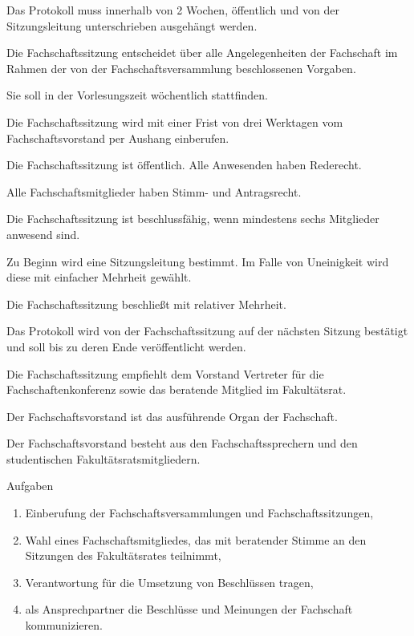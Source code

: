 \documentclass[a4paper, parskip=half, numbers=noenddot]{scrartcl}
\begin{document}
\begin{contract}
Das Protokoll muss innerhalb von 2 Wochen, öffentlich und von der Sitzungsleitung unterschrieben ausgehängt werden.

\enlargethispage*{\baselineskip}
\pagebreak


%
%

%
\label{fs:sitzung}

Die Fachschaftssitzung entscheidet über alle Angelegenheiten der Fachschaft im Rahmen der von der Fachschaftsversammlung beschlossenen Vorgaben.

Sie soll in der Vorlesungszeit wöchentlich stattfinden.

Die Fachschaftssitzung wird mit einer Frist von drei Werktagen vom Fachschaftsvorstand per Aushang einberufen.

Die Fachschaftssitzung ist öffentlich. Alle Anwesenden haben Rederecht.

Alle Fachschaftsmitglieder haben Stimm- und Antragsrecht.

Die Fachschaftssitzung ist beschlussfähig, wenn mindestens sechs Mitglieder anwesend sind.

Zu Beginn wird eine Sitzungsleitung bestimmt. Im Falle von Uneinigkeit wird diese mit einfacher Mehrheit gewählt.

Die Fachschaftssitzung beschließt mit relativer Mehrheit.

Das Protokoll wird von der Fachschaftssitzung auf der nächsten Sitzung bestätigt und soll bis zu deren Ende veröffentlicht werden.

Die Fachschaftssitzung empfiehlt dem Vorstand Vertreter für die Fachschaftenkonferenz sowie das beratende Mitglied im Fakultätsrat.


%
%

%
\label{fs:vorstand}

Der Fachschaftsvorstand ist das ausführende Organ der Fachschaft.

Der Fachschaftsvorstand besteht aus den Fachschaftssprechern und den studentischen Fakultäts\-ratsmitgliedern.

Aufgaben
\begin{enumerate}
\item Einberufung der Fachschaftsversammlungen und Fachschaftssitzungen,
\item Wahl eines Fachschaftsmitgliedes, das mit beratender Stimme an den Sitzungen des Fakultäts\-rates teilnimmt,
\item Verantwortung für die Umsetzung von Beschlüssen tragen,
\item als Ansprechpartner die Beschlüsse und Meinungen der Fachschaft kommunizieren.
\end{enumerate}


\end{contract}
\end{document}
